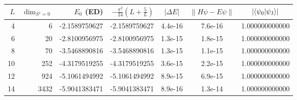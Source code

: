 \begin{tabular}{r r r r c c c}
\toprule
$L$ & $\dim_{S^z=0}$ & $E_0$ (ED) & $-\frac{\pi^2}{24}(L+\frac{5}{L})$ & $|\Delta E|$ & $\|H\psi-E\psi\|$ & $|\langle \psi_0|\psi_{\rm J}\rangle|$ \\
\midrule
4 & 6 & -2.1589759627 & -2.1589759627 & 4.4e-16 & 7.6e-16 & 1.000000000000 \\
6 & 20 & -2.8100956975 & -2.8100956975 & 1.3e-15 & 1.8e-15 & 1.000000000000 \\
8 & 70 & -3.5468890816 & -3.5468890816 & 1.3e-15 & 1.1e-15 & 1.000000000000 \\
10 & 252 & -4.3179519255 & -4.3179519255 & 3.6e-15 & 2.2e-15 & 1.000000000000 \\
12 & 924 & -5.1061494992 & -5.1061494992 & 8.9e-15 & 6.9e-15 & 1.000000000000 \\
14 & 3432 & -5.9041383471 & -5.9041383471 & 8.9e-16 & 1.3e-14 & 1.000000000000 \\
\bottomrule
\end{tabular}
